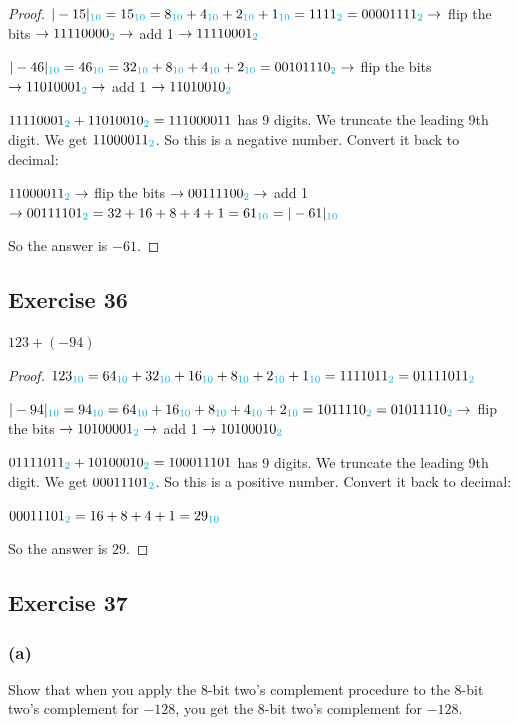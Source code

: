\documentclass[14pt]{extarticle}
\newcommand{\base}[1]{{\color{cyan}#1}}
\begin{document}
\begin{proof} 
$|-15|_\base{10} = 15_\base{10} = 8_\base{10} + 4_\base{10} +
2_\base{10} + 1_\base{10} = 1111_\base{2} = 00001111_\base{2} \to$ flip the bits $\to 11110000_\base{2} \to$ add 1 $\to 11110001_\base{2}$

$|-46|_\base{10} = 46_\base{10} = 32_\base{10} + 8_\base{10} + 4_\base{10} + 2_\base{10} = 00101110_\base{2} \to$ flip the bits $\to 11010001_\base{2} \to$ add 1 $\to 11010010_\base{2}$

$11110001_\base{2} + 11010010_\base{2} = 1 1100 0011$ has 9 digits. We truncate the leading 9th digit. We get $11000011_\base{2}$. So this is a negative number. Convert it back to decimal:

$11000011_\base{2} \to$ flip the bits $\to 00111100_\base{2} \to$ add 1 $\to 00111101_\base{2} = 32 + 16 + 8 + 4 + 1 = 61_\base{10} = |-61|_\base{10}$

So the answer is $-61$. 
\end{proof}

\subsection{Exercise 36} 
$123 + (-94)$

\begin{proof} 
$123_\base{10} = 64_\base{10} + 32_\base{10} + 16_\base{10} +
8_\base{10} + 2_\base{10} + 1_\base{10} = 1111011_\base{2} = 01111011_\base{2}$

$|-94|_\base{10} = 94_\base{10} = 64_\base{10} + 16_\base{10} + 8_\base{10} + 4_\base{10} + 2_\base{10} = 1011110_\base{2} = 01011110_\base{2} \to$ flip the bits $\to 10100001_\base{2} \to$ add 1 $\to 10100010_\base{2}$

$01111011_\base{2} + 10100010_\base{2} = 1 0001 1101$ has 9 digits. We truncate the leading 9th digit. We get $00011101_\base{2}$. So this is a positive number. Convert it back to decimal:

$00011101_\base{2} = 16 + 8 + 4 + 1 = 29_\base{10}$

So the answer is $29$. 
\end{proof}

\subsection{Exercise 37} 
\subsubsection{(a)} 
Show that when you apply the 8-bit two's complement procedure to the 8-bit two’s complement for $-128$, you get the 8-bit two’s complement for $-128$.
\end{document}
